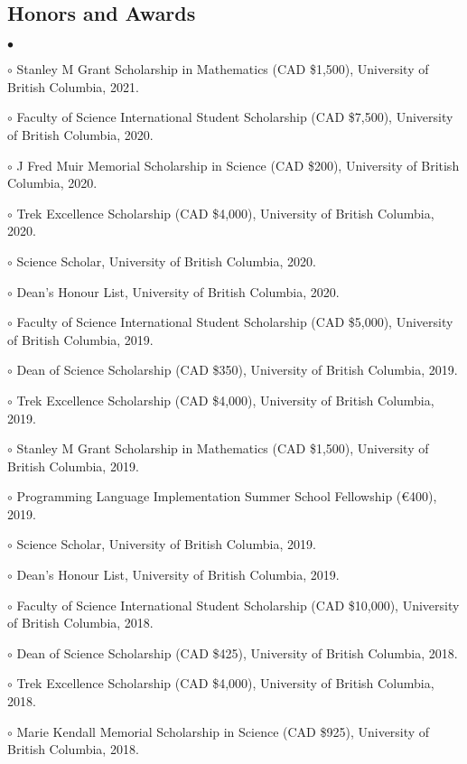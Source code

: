 \documentclass[margin,line]{res}
\newenvironment{list2}{
  \begin{list}{$\bullet$}{%
      \setlength{\itemsep}{0in}
      \setlength{\parsep}{0in} \setlength{\parskip}{0in}
      \setlength{\topsep}{0in} \setlength{\partopsep}{0in}
      \setlength{\leftmargin}{0.2in}}}{\end{list}}
\begin{document}
\begin{resume}
\section{\sc Honors and Awards}

\begin{list2}
\item[$\circ$] Stanley M Grant Scholarship in Mathematics (CAD \$1,500), University of British Columbia, 2021.
\item[$\circ$] Faculty of Science International Student Scholarship (CAD \$7,500), University of British Columbia, 2020.
\item[$\circ$] J Fred Muir Memorial Scholarship in Science (CAD \$200), University of British Columbia, 2020.
\item[$\circ$] Trek Excellence Scholarship (CAD \$4,000), University of British Columbia, 2020.
\item[$\circ$] Science Scholar, University of British Columbia, 2020.
\item[$\circ$] Dean's Honour List, University of British Columbia, 2020.
\item[$\circ$] Faculty of Science International Student Scholarship (CAD \$5,000), University of British Columbia, 2019.
\item[$\circ$] Dean of Science Scholarship (CAD \$350), University of British Columbia, 2019.
\item[$\circ$] Trek Excellence Scholarship (CAD \$4,000), University of British Columbia, 2019.
\item[$\circ$] Stanley M Grant Scholarship in Mathematics (CAD \$1,500), University of British Columbia, 2019.
\item[$\circ$] Programming Language Implementation Summer School Fellowship (€400), 2019.
\item[$\circ$] Science Scholar, University of British Columbia, 2019.
\item[$\circ$] Dean's Honour List, University of British Columbia, 2019.
\item[$\circ$] Faculty of Science International Student Scholarship (CAD \$10,000), University of British Columbia, 2018.
\item[$\circ$] Dean of Science Scholarship (CAD \$425), University of British Columbia, 2018.
\item[$\circ$] Trek Excellence Scholarship (CAD \$4,000), University of British Columbia, 2018.
\item[$\circ$] Marie Kendall Memorial Scholarship in Science (CAD \$925), University of British Columbia, 2018.

\end{list2}
\end{resume}
\end{document}
